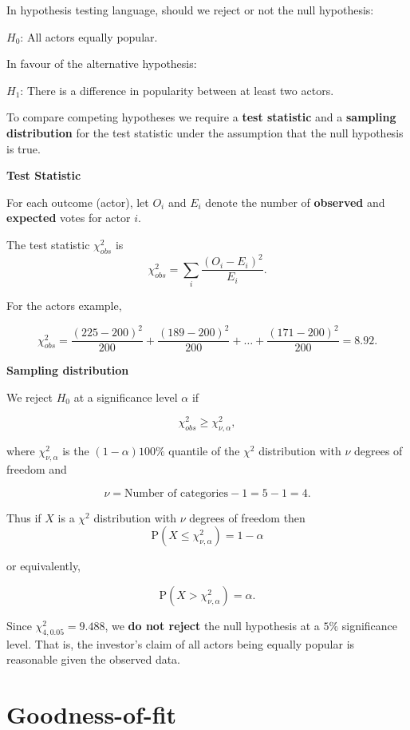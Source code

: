 \documentclass[
]{book}
\begin{document}
In hypothesis testing language, should we reject or not the null hypothesis:

\(H_0\): All actors equally popular.

In favour of the alternative hypothesis:

\(H_1\): There is a difference in popularity between at least two actors.

To compare competing hypotheses we require a {\textbf{test statistic}} and a {\textbf{sampling distribution}} for the test statistic under the assumption that the null hypothesis is true.

{\textbf{Test Statistic}}

For each outcome (actor), let \(O_i\) and \(E_i\) denote the number of {\textbf{observed}} and {\textbf{expected}} votes for actor \(i\).

The test statistic \(\chi_{obs}^2\) is\\

\[ \chi^2_{obs} = \sum_i \frac{(O_i - E_i)^2 }{E_i}. \]

For the actors example,

\[ \chi^2_{obs} = \frac{(225-200)^2}{200} +\frac{(189-200)^2}{200} + \ldots + \frac{(171-200)^2}{200} = 8.92. \]

{\textbf{Sampling distribution}}

We reject \(H_0\) at a significance level \(\alpha\) if

\[ \chi^2_{obs} \geq \chi^2_{\nu, \alpha}, \]

where \(\chi^2_{\nu, \alpha}\) is the \((1- \alpha) 100 \%\) quantile of the \(\chi^2\) distribution with \(\nu\) degrees of freedom and

\[ \nu = \mbox{Number of categories} - 1 =5-1=4. \]

Thus if \(X\) is a \(\chi^2\) distribution with \(\nu\) degrees of freedom then\\

\[ \mathrm{P} \left(X \leq \chi^2_{\nu, \alpha}  \right) = 1- \alpha \]

or equivalently,

\[ \mathrm{P} \left(X > \chi^2_{\nu, \alpha}  \right) =  \alpha. \]

Since \(\chi^2_{4,0.05} = 9.488\), we \textbf{do not reject} the null hypothesis at a \(5 \%\) significance level. That is, the investor's claim of all actors being equally popular is reasonable given the observed data.

\hypertarget{Hypo_Test_Discrete:GoF}{%
\section{Goodness-of-fit}\label{Hypo_Test_Discrete:GoF}}
\end{document}

